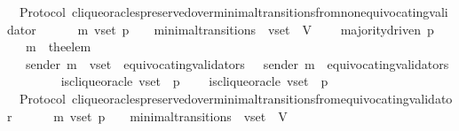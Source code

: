 \begin{isabellebody}
%
\endisatagproof
{\isafoldproof}%
%
\isadelimproof
\isanewline
%
\endisadelimproof
\isanewline
\isanewline
{}\isamarkupfalse%
\ {\isacharparenleft}\ Protocol{\isacharparenright}\ clique{\isacharunderscore}oracles{\isacharunderscore}preserved{\isacharunderscore}over{\isacharunderscore}minimal{\isacharunderscore}transitions{\isacharunderscore}from{\isacharunderscore}non{\isacharunderscore}equivocating{\isacharunderscore}validator\ {\isacharcolon}\isanewline
\ \ {\isachardoublequoteopen}{\isasymforall}\ {\isasymsigma}\ {\isasymsigma}{\isacharprime}\ m{\isacharprime}\ v{\isacharunderscore}set\ p{\isachardot}\ {\isacharparenleft}{\isasymsigma}{\isacharcomma}\ {\isasymsigma}{\isacharprime}{\isacharparenright}\ {\isasymin}\ minimal{\isacharunderscore}transitions\ {\isasymand}\ v{\isacharunderscore}set\ {\isasymsubseteq}\ V\ \isanewline
\ \ {\isasymlongrightarrow}\ majority{\isacharunderscore}driven\ p\isanewline
\ \ {\isasymlongrightarrow}\ m{\isacharprime}\ {\isacharequal}\ the{\isacharunderscore}elem\ {\isacharparenleft}{\isasymsigma}{\isacharprime}\ {\isacharminus}\ {\isasymsigma}{\isacharparenright}\isanewline
\ \ {\isasymlongrightarrow}\ sender\ m{\isacharprime}\ {\isasymin}\ v{\isacharunderscore}set\ {\isacharminus}\ equivocating{\isacharunderscore}validators\ {\isasymsigma}\ {\isasymand}\ sender\ m{\isacharprime}\ {\isasymnotin}\ equivocating{\isacharunderscore}validators\ {\isasymsigma}{\isacharprime}\isanewline
\ \ \ \ \ \ {\isasymand}\ is{\isacharunderscore}clique{\isacharunderscore}oracle\ {\isacharparenleft}v{\isacharunderscore}set{\isacharcomma}\ {\isasymsigma}{\isacharcomma}\ p{\isacharparenright}\ \isanewline
\ \ {\isasymlongrightarrow}\ is{\isacharunderscore}clique{\isacharunderscore}oracle\ {\isacharparenleft}v{\isacharunderscore}set{\isacharcomma}\ {\isasymsigma}{\isacharprime}{\isacharcomma}\ p{\isacharparenright}{\isachardoublequoteclose}\isanewline
%
\isadelimproof
\ \ %
\endisadelimproof
%
\isatagproof
{}\isamarkupfalse%
%
\endisatagproof
{\isafoldproof}%
%
\isadelimproof
\isanewline
%
\endisadelimproof
\isanewline
\isanewline
{}\isamarkupfalse%
\ {\isacharparenleft}\ Protocol{\isacharparenright}\ clique{\isacharunderscore}oracles{\isacharunderscore}preserved{\isacharunderscore}over{\isacharunderscore}minimal{\isacharunderscore}transitions{\isacharunderscore}from{\isacharunderscore}equivocating{\isacharunderscore}validator\ {\isacharcolon}\isanewline
\ \ {\isachardoublequoteopen}{\isasymforall}\ {\isasymsigma}\ {\isasymsigma}{\isacharprime}\ m{\isacharprime}\ v{\isacharunderscore}set\ p{\isachardot}\ {\isacharparenleft}{\isasymsigma}{\isacharcomma}\ {\isasymsigma}{\isacharprime}{\isacharparenright}\ {\isasymin}\ minimal{\isacharunderscore}transitions\ {\isasymand}\ v{\isacharunderscore}set\ {\isasymsubseteq}\ V\ \isanewline

\end{isabellebody}
